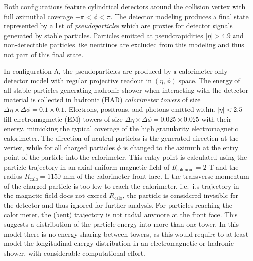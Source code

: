 \documentclass[11pt]{cernrep}
\begin{document}
Both configurations feature cylindrical detectors around the collision vertex with full azimuthal coverage $-\pi < \phi < \pi$.
The detector modeling produces a final state represented by a list of \emph{pseudoparticles} which are proxies for detector signals generated by stable particles.
Particles emitted at pseudorapidities $|\eta| > 4.9$ and non-detectable particles like neutrinos are excluded from this modeling and thus not part of this final state. 

In configuration A, the pseudoparticles are produced by a calorimeter-only detector model with regular projective readout in $(\eta,\phi)$ space. 
The energy of all stable particles generating hadronic shower when interacting with the detector material is collected 
in hadronic (HAD) \emph{calorimeter towers} of size $\Delta\eta\times\Delta\phi = 0.1\times0.1$. 
Electrons, positrons, and photons emitted within $|\eta| < 2.5$ fill electromagmetic (EM) towers of size $\Delta\eta\times\Delta\phi = 0.025\times0.025$ with their energy, mimicking the typical
coverage of the high granularity electromagnetic calorimeter. 
The direction of neutral particles is the generated direction at the vertex, while for all charged particles $\phi$ is changed to the azimuth at the entry point of the particle
into the calorimeter. 
This entry point is calculated using the particle trajectory in an axial uniform magnetic field of $B_{\text{solenoid}} = 2$%
 T and the radius $R_{\text{calo}} = 1150$ mm of
 the calorimeter front face.
If the transverse momentum of the charged particle  is too low to reach the calorimeter, i.e.\ its trajectory in the magnetic field does not exceed $R_{\text{calo}}$, 
the particle is considered invisible for the detector and thus ignored for further analysis.   
For particles reaching the calorimeter, the (bent) trajectory is not radial anymore at the front face.
This suggests a distribution of the particle energy into more than one tower.
In this model there is no energy sharing between towers, as this would require to at least model the longitudinal energy distribution in an electromagnetic or hadronic shower, with considerable computational effort.
\end{document}
